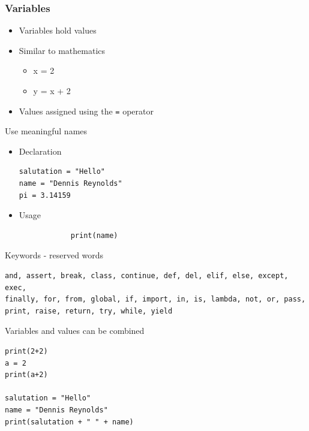 \documentclass[10pt, a4paper]{beamer} %
\begin{document}
\begin{frame}\frametitle{Variables}
    \begin{itemize}
        \item Variables hold values
        \item Similar to mathematics
        \begin{itemize}
            \item x = 2
            \item y = x + 2
        \end{itemize}
        \item Values assigned using the \texttt{=} operator
    \end{itemize}
    \begin{examples}
    Use meaningful names
    \begin{itemize}
        \item Declaration
        \begin{lstlisting}
salutation = "Hello"
name = "Dennis Reynolds"
pi = 3.14159
        \end{lstlisting}
        \item Usage
        \begin{lstlisting}
            print(name)
        \end{lstlisting}
    \end{itemize}
        
    \end{examples}
\framebreak
\begin{block}{Keywords - reserved words}

\begin{lstlisting}
and, assert, break, class, continue, def, del, elif, else, except, exec, 
finally, for, from, global, if, import, in, is, lambda, not, or, pass, 
print, raise, return, try, while, yield
\end{lstlisting}
    
\end{block}
\framebreak
\begin{block}{Variables and values can be combined}
    \begin{lstlisting}
print(2+2)
a = 2
print(a+2)

salutation = "Hello"
name = "Dennis Reynolds"
print(salutation + " " + name)
    \end{lstlisting}
\end{block}
\end{frame}
\end{document}
